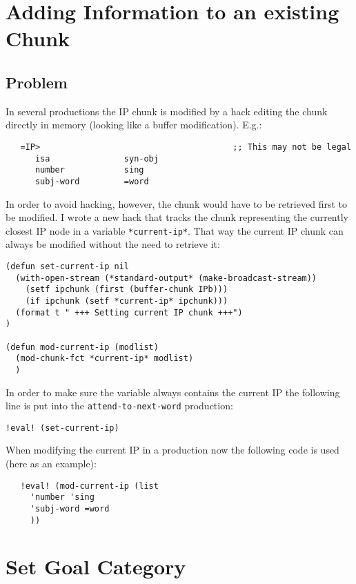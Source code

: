 \documentclass[nobf,fignum,doc,longtable]{apa}
\begin{document}
\section{Adding Information to an existing Chunk}
\subsection{Problem}
In several productions the IP chunk is modified by a hack editing the chunk directly in memory (looking like a buffer modification). E.g.:

{\scriptsize \begin{verbatim}
   =IP>                                       ;; This may not be legal
      isa               syn-obj
      number            sing
      subj-word         =word
\end{verbatim}}

In order to avoid hacking, however, the chunk would have to be retrieved first to be modified. I wrote a new hack that tracks the chunk representing the currently closest IP node in a variable \texttt{*current-ip*}. That way the current IP chunk can always be modified without the need to retrieve it:

{\scriptsize \begin{verbatim}
(defun set-current-ip nil
  (with-open-stream (*standard-output* (make-broadcast-stream))
    (setf ipchunk (first (buffer-chunk IPb)))
    (if ipchunk (setf *current-ip* ipchunk)))
  (format t " +++ Setting current IP chunk +++")
)

(defun mod-current-ip (modlist)
  (mod-chunk-fct *current-ip* modlist)
  )
\end{verbatim}}

In order to make sure the variable always contains the current IP the following line is put into the \texttt{attend-to-next-word} production:
{\scriptsize \begin{verbatim}
!eval! (set-current-ip)
\end{verbatim}}

When modifying the current IP in a production now the following code is used (here as an example):
{\scriptsize \begin{verbatim}
   !eval! (mod-current-ip (list 
     'number 'sing 
     'subj-word =word
     ))
\end{verbatim}}



\section{Set Goal Category}
\end{document}
